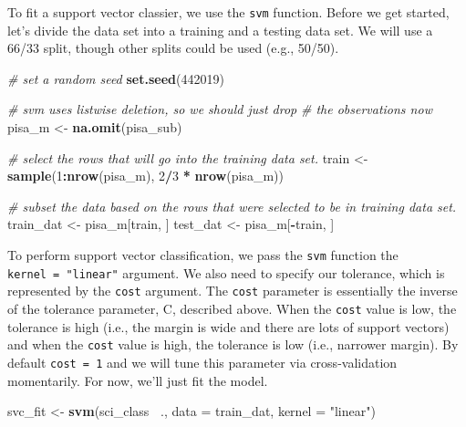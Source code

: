 \documentclass[]{book}
\newenvironment{Shaded}{\begin{snugshade}}{\end{snugshade}}
\newcommand{\CommentTok}[1]{\textcolor[rgb]{0.56,0.35,0.01}{\textit{#1}}}
\newcommand{\DataTypeTok}[1]{\textcolor[rgb]{0.13,0.29,0.53}{#1}}
\newcommand{\DecValTok}[1]{\textcolor[rgb]{0.00,0.00,0.81}{#1}}
\newcommand{\KeywordTok}[1]{\textcolor[rgb]{0.13,0.29,0.53}{\textbf{#1}}}
\newcommand{\NormalTok}[1]{#1}
\newcommand{\OperatorTok}[1]{\textcolor[rgb]{0.81,0.36,0.00}{\textbf{#1}}}
\newcommand{\StringTok}[1]{\textcolor[rgb]{0.31,0.60,0.02}{#1}}
\begin{document}
To fit a support vector classier, we use the \texttt{svm} function. Before we get started, let's divide the data set into a training and a testing data set. We will use a 66/33 split, though other splits could be used (e.g., 50/50).

\begin{Shaded}
\begin{Highlighting}[]
\CommentTok{# set a random seed}
\KeywordTok{set.seed}\NormalTok{(}\DecValTok{442019}\NormalTok{)}

\CommentTok{# svm uses listwise deletion, so we should just drop}
\CommentTok{# the observations now}
\NormalTok{pisa_m <-}\StringTok{ }\KeywordTok{na.omit}\NormalTok{(pisa_sub)}

\CommentTok{# select the rows that will go into the training data set.}
\NormalTok{train <-}\StringTok{ }\KeywordTok{sample}\NormalTok{(}\DecValTok{1}\OperatorTok{:}\KeywordTok{nrow}\NormalTok{(pisa_m), }\DecValTok{2}\OperatorTok{/}\DecValTok{3} \OperatorTok{*}\StringTok{ }\KeywordTok{nrow}\NormalTok{(pisa_m))}

\CommentTok{# subset the data based on the rows that were selected to be in training data set.}
\NormalTok{train_dat <-}\StringTok{ }\NormalTok{pisa_m[train, ]}
\NormalTok{test_dat <-}\StringTok{ }\NormalTok{pisa_m[}\OperatorTok{-}\NormalTok{train, ]}
\end{Highlighting}
\end{Shaded}

To perform support vector classification, we pass the \texttt{svm} function the \texttt{kernel\ =\ "linear"} argument. We also need to specify our tolerance, which is represented by the \texttt{cost} argument. The \texttt{cost} parameter is essentially the inverse of the tolerance parameter, C, described above. When the \texttt{cost} value is low, the tolerance is high (i.e., the margin is wide and there are lots of support vectors) and when the \texttt{cost} value is high, the tolerance is low (i.e., narrower margin). By default \texttt{cost\ =\ 1} and we will tune this parameter via cross-validation momentarily. For now, we'll just fit the model.

\begin{Shaded}
\begin{Highlighting}[]
\NormalTok{svc_fit <-}\StringTok{ }\KeywordTok{svm}\NormalTok{(sci_class }\OperatorTok{~}\NormalTok{., }\DataTypeTok{data =}\NormalTok{ train_dat, }\DataTypeTok{kernel =} \StringTok{"linear"}\NormalTok{)}
\end{Highlighting}
\end{Shaded}
\end{document}

